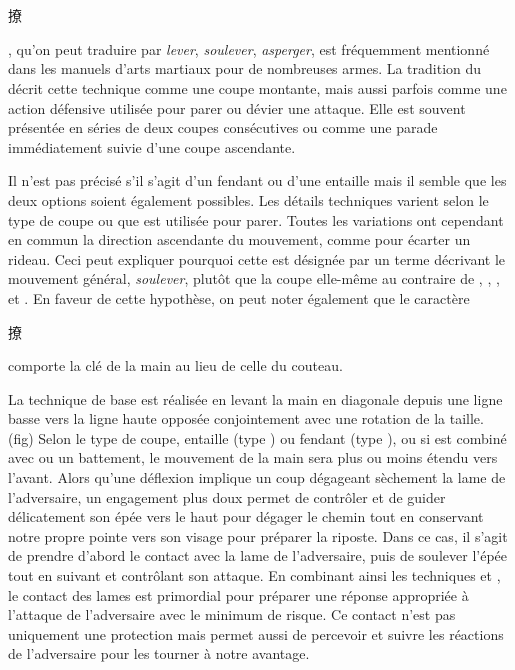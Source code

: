 \section{\Liao}
\Liao{} \begin{CJK*}{UTF8}{bsmi}撩\end{CJK*}, qu'on peut traduire par \textit{lever}, \textit{soulever}, \textit{asperger}, est fréquemment mentionné dans les manuels d'arts martiaux pour de nombreuses armes. La tradition du \Yangjia{} \Michuan{} décrit cette technique comme une coupe montante, mais aussi parfois comme une action défensive utilisée pour parer ou dévier une attaque. Elle est souvent présentée en séries de deux coupes consécutives ou comme une parade immédiatement suivie d'une coupe ascendante.

Il n'est pas précisé s'il s'agit d'un fendant ou d'une entaille mais il semble que les deux options soient également possibles. Les détails techniques varient selon le type de coupe ou que \Liao{} est utilisée pour parer. Toutes les variations ont cependant en commun la direction ascendante du mouvement, comme pour écarter un rideau. Ceci peut expliquer pourquoi cette \Jianfa{} est désignée par un terme décrivant le mouvement général, \textit{soulever}, plutôt que la coupe elle-même au contraire de \Ci{}, \Pi{}, \Duo{}, et \Hua{}. En faveur de cette hypothèse, on peut noter également que le caractère \Liao{} \begin{CJK*}{UTF8}{bsmi}撩\end{CJK*} comporte la clé de la main au lieu de celle du couteau.

La technique \Liao{} de base est réalisée en levant la main en diagonale depuis une ligne basse vers la ligne haute opposée conjointement avec une rotation de la taille. (fig)
Selon le type de coupe, entaille (type \Hua{})  ou fendant (type \Pi{}), ou si \Liao{} est combiné avec \Mo{} ou un battement, le mouvement de la main sera plus ou moins étendu vers l'avant. Alors qu'une déflexion implique un coup dégageant sèchement la lame de l'adversaire, un engagement plus doux permet de contrôler et de guider délicatement son épée vers le haut pour dégager le chemin tout en conservant notre propre pointe vers son visage pour préparer la riposte. Dans ce cas, il s'agit de prendre d'abord le contact avec la lame de l'adversaire, puis de soulever l'épée tout en suivant et contrôlant son attaque. En combinant ainsi les techniques \Liao{} et \Mo{}, le contact des lames est primordial pour préparer une réponse appropriée à l'attaque de l'adversaire avec le minimum de risque. Ce contact n'est pas uniquement une protection mais permet aussi de percevoir et suivre les réactions de l'adversaire pour les tourner à notre avantage.

